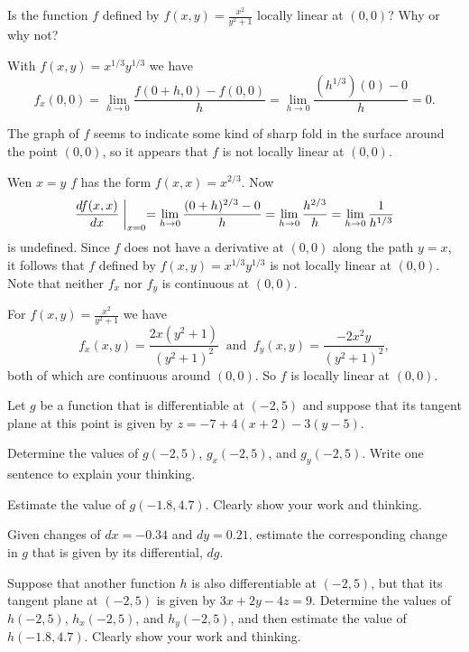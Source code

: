\begin{exercises}
    \item Is the function $f$ defined by $f(x,y) = \frac{x^2}{y^2+1}$ locally linear at $(0,0)$? Why or why not?

    \ea

\begin{exerciseSolution}
    \ba
    \item With $f(x,y) = x^{1/3}y^{1/3}$ we have 
    \[f_x(0,0) = \lim_{h \to 0} \frac{f(0+h,0)-f(0,0)}{h} = \lim_{h \to 0} \frac{(h^{1/3})(0)-0}{h} = 0.\]

    \item The graph of $f$ seems to indicate some kind of sharp fold in the surface around the point $(0,0)$, so it appears that $f$ is not locally linear at $(0,0)$.

    \item Wen $x=y$ $f$ has the form $f(x,x) = x^{2/3}$. Now
\[\frac{d f(x,x)}{dx}\biggm|_{x=0} = \lim_{h \to 0} \frac{(0+h)^{2/3} - 0}{h} = \lim_{h \to 0} \frac{h^{2/3}}{h} = \lim_{h \to 0} \frac{1}{h^{1/3}}\]
is undefined. Since $f$ does not have a derivative at $(0,0)$ along the path $y=x$, it follows that $f$ defined by $f(x,y) = x^{1/3}y^{1/3}$ is not locally linear at $(0,0)$. Note that neither $f_x$ nor $f_y$ is continuous at $(0,0)$.

    \item For $f(x,y) = \frac{x^2}{y^2+1}$ we have 
\[f_x(x,y) = \frac{2x(y^2+1)}{(y^2+1)^2} \ \text{ and } \ f_y(x,y) = \frac{-2x^2y}{(y^2+1)^2},\]
both of which are continuous around $(0,0)$. So $f$ is locally linear at $(0,0)$. 

    \ea
\end{exerciseSolution}

\item \label{Ez:10.4.1}   Let $g$ be a function that is differentiable at $(-2,5)$ and suppose that its tangent plane at this point is given by $z = -7 + 4(x+2) - 3(y-5)$.				
    \ba
   	\item Determine the values of $g(-2,5)$, $g_x(-2,5)$, and $g_y(-2,5)$.  Write one sentence to explain your thinking.
	\item Estimate the value of $g(-1.8, 4.7)$.  Clearly show your work and thinking.
	\item Given changes of $dx = -0.34$ and $dy = 0.21$, estimate the corresponding change in $g$ that is given by its differential, $dg$.
	\item Suppose that another function $h$ is also differentiable at $(-2,5)$, but that its tangent plane at $(-2,5)$ is given by $3x + 2y - 4z = 9.$  Determine the values of $h(-2,5)$, $h_x(-2,5)$, and $h_y(-2,5)$, and then estimate the value of $h(-1.8, 4.7)$.  Clearly show your work and thinking.
    \ea


\end{exercises}
